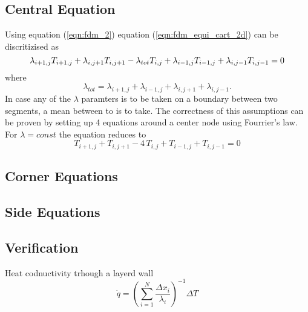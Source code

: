 \subsection{Central Equation}
Using equation (\ref{eqn:fdm_2}) equation (\ref{eqn:fdm_equi_cart_2d}) can be discritizised as
\begin{equation}
  \lambda_{i+1, j}T_{i + 1, j}  + \lambda_{i, j + 1}T_{i, j + 1} - \\
  \lambda_{tot} T_{i, j} + \\
  \lambda_{i-1, j}T_{i-1, j}  + \lambda_{i, j -1}T_{i, j - 1} = 0
\end{equation}
where
\begin{equation}
  \lambda_{tot} = \lambda_{i+1, j} + \lambda_{i-1, j} + \lambda_{i, j+1} + \lambda_{i, j-1}.
\end{equation}
In case any of the $\lambda$ paramters is to be taken on a boundary between two segments, a mean between to is to take.
The correctness of this assumptions can be proven by setting up 4 equations around a center node using Fourrier's law.
For $\lambda = const$ the equation reduces to
\begin{equation}
  T_{i + 1, j}  + T_{i, j + 1} - 4 \, T_{i, j} + T_{i-1, j}  + T_{i, j - 1} = 0
\end{equation}

\subsection{Corner Equations}

\subsection{Side Equations}

\subsection{Verification}
Heat codnuctivity trhough a layerd wall
\begin{equation}
  \dot{q} = \left( \sum_{i = 1}^{N} \frac{\Delta x_i}{\lambda_i} \right)^{-1}\Delta T
\end{equation}
